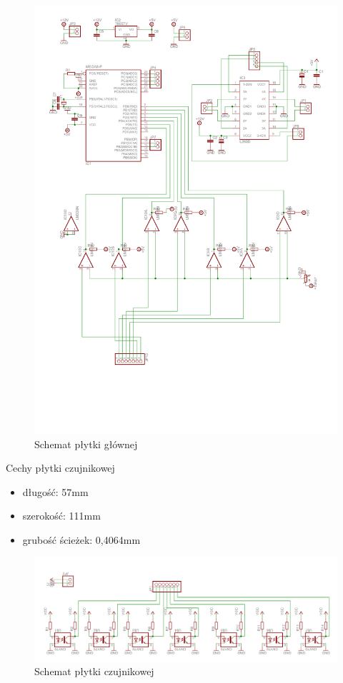 \documentclass[11pt,a4paper]{article}
\begin{document}
  \begin{figure}[H]
  \includegraphics[scale=0.8]{schemat_glowna}
  \caption{Schemat płytki głównej}
\end{figure}

  Cechy płytki czujnikowej
  \begin{itemize}
    \item długość: 57mm
    \item szerokość: 111mm
    \item grubość ścieżek: 0,4064mm
  \end{itemize}

  \begin{figure}[H]
  \includegraphics[scale=0.38]{schemat_czujniki}
  \caption{Schemat płytki czujnikowej}
\end{figure}
\end{document}
